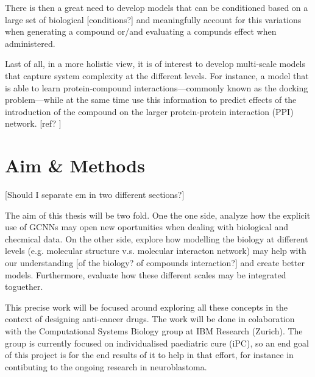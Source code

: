 \documentclass{article}
\begin{document}
There is then a great need to develop models that can be conditioned based on a large
set of biological [conditions?] and meaningfully account for this variations when
generating a compound or/and evaluating a compunds effect when administered.

Last of all, in a more holistic view, it is of interest to develop multi-scale models
that capture system complexity at the different levels. For instance, a model that is
able to learn protein-compound interactions---commonly known as the docking
problem---while at the same time use this information to predict effects of the
introduction of the compound on the larger protein-protein interaction (PPI) network.
[ref? \cite{Sun2019}]

    \section*{Aim \& Methods}
[Should I separate em in two different sections?]

The aim of this thesis will be two fold. One the one side, analyze how the explicit use
of GCNNs may open new oportunities when dealing with biological and checmical data. On
the other side, explore how modelling the biology at different levels (e.g. molecular
structure v.s. molecular interacton network) may help with our understanding [of the
biology? of compounds interaction?] and create better models. Furthermore, evaluate how
these different scales may be integrated toguether.

This precise work will be focused around exploring all these concepts in the context of
designing anti-cancer drugs. The work will be done in colaboration with the
Computational Systems Biology group at IBM Research (Zurich). The group is currently
focused on individualised paediatric cure (iPC), so an end goal of this project is for
the end results of it to help in that effort, for instance in contibuting to the ongoing
research in neuroblastoma.
\end{document}
